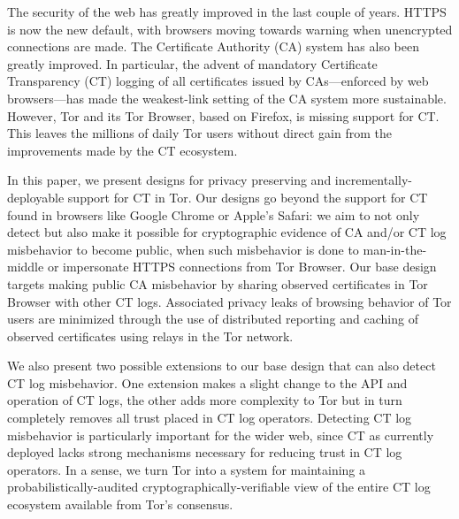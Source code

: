 The security of the web has greatly improved in the last couple of years. HTTPS
is now the new default, with browsers moving towards warning when unencrypted
connections are made. The Certificate Authority (CA) system has also been
greatly improved. In particular, the advent of mandatory Certificate
Transparency (CT) logging of all certificates issued by CAs---enforced by web
browsers---has made the weakest-link setting of the CA system more sustainable.
However, Tor and its Tor Browser, based on Firefox, is missing support for CT.
This leaves the millions of daily Tor users without direct gain from the
improvements made by the CT ecosystem.

In this paper, we present designs for privacy preserving and
incrementally-deployable support for CT in Tor. Our designs go beyond the
support for CT found in browsers like Google Chrome or Apple's Safari: we aim to
not only detect but also make it possible for cryptographic evidence of CA
and/or CT log misbehavior to become public, when such misbehavior is done to
man-in-the-middle or impersonate HTTPS connections from Tor Browser. Our base
design targets making public CA misbehavior by sharing observed certificates in
Tor Browser with other CT logs. Associated privacy leaks of browsing behavior of
Tor users are minimized through the use of distributed reporting and caching of
observed certificates using relays in the Tor network.

We also present two possible extensions to our base design that can also detect
CT log misbehavior. One extension makes a slight change to the API and operation
of CT logs, the other adds more complexity to Tor but in turn completely removes
all trust placed in CT log operators. Detecting CT log misbehavior is
particularly important for the wider web, since CT as currently deployed lacks
strong mechanisms necessary for reducing trust in CT log operators. In a sense,
we turn Tor into a system for maintaining a probabilistically-audited
cryptographically-verifiable view of the entire CT log ecosystem available from
Tor’s consensus.